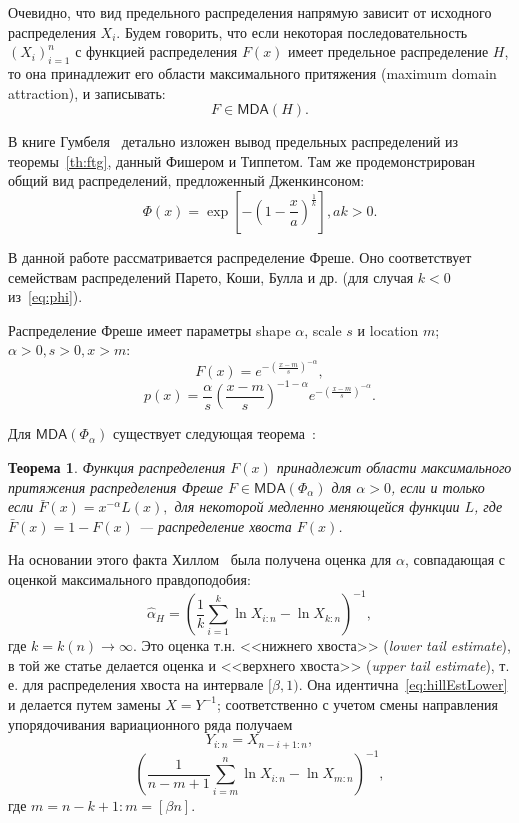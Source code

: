 \documentclass[12pt, specialist, subf, substylefile = spbu.rtx]{disser}
\newtheorem{theorem}{Теорема}
\newcommand{\MDA}{\mathsf{MDA}}
\begin{document}
Очевидно, что вид предельного распределения напрямую зависит от исходного распределения $X_i$. Будем говорить, что если некоторая последовательность $(X_i)_{i=1}^n$ с функцией распределения $F(x)$ имеет предельное распределение $H$, то она принадлежит его области максимального притяжения (maximum domain attraction), и записывать:
$$
F \in \MDA(H).
$$

В книге Гумбеля~\cite[стр.~194]{Gumbel} детально изложен вывод предельных распределений из теоремы~\ref{th:ftg}, данный Фишером и Типпетом. Там же продемонстрирован общий вид распределений, предложенный Дженкинсоном:
\begin{equation}\label{eq:phi}
\Phi(x)=\exp\left[-\left(1-\frac{x}{a}\right)^{\frac{1}{k}}\right], ak>0.
\end{equation}

В данной работе рассматривается распределение Фреше. Оно соответствует семействам распределений Парето, Коши, Булла и др. (для случая $k<0$ из~\eqref{eq:phi}).

Распределение Фреше имеет параметры shape $\alpha$, scale $s$ и location $m$; $\alpha>0, s>0, x>m$:
$$ F(x)=e^{-(\frac{x-m}{s})^{-\alpha}}, $$
$$ p(x)=\frac{\alpha}{s} \left(\frac{x-m}{s}\right)^{-1-\alpha} e^{-(\frac{x-m}{s})^{-\alpha}}.$$

Для $\MDA(\Phi_\alpha)$ существует следующая теорема~\cite[стр.~142]{Embrechts}:
\begin{theorem}\label{th:freclim}
Функция распределения $F(x)$ принадлежит области максимального притяжения распределения Фреше $F \in \MDA(\Phi_\alpha)$ для $\alpha > 0$, если и только если $\bar{F}(x)=x^{-\alpha}L(x),$ для некоторой медленно меняющейся функции $L$, где $\bar{F}(x)=1-F(x)$ --- распределение хвоста $F(x)$.
\end{theorem}
На основании этого факта Хиллом~\cite{Hill} была получена оценка для $\alpha$, совпадающая с оценкой максимального правдоподобия:
\begin{equation}\label{eq:hillEstLower}
\hat{\alpha}_H=\left(\frac{1}{k} \sum\limits_{i=1}^k \ln X_{i:n}-\ln X_{k:n} \right)^{-1},
\end{equation}
где $k=k(n) \to \infty$. Это оценка т.н. <<нижнего хвоста>> (\textit{lower tail estimate}), в той же статье делается оценка и <<верхнего хвоста>> (\textit{upper tail estimate}), т. е. для распределения хвоста на интервале $[\beta, 1)$. Она идентична~\eqref{eq:hillEstLower} и делается путем замены $X=Y^{-1}$; соответственно с учетом смены направления упорядочивания вариационного ряда получаем 
$$
Y_{i:n}=X_{n-i+1:n},
$$
\begin{equation}\label{eq:hillEst}
\left(\frac{1}{n-m+1} \sum\limits_{i=m}^n \ln X_{i:n}-\ln X_{m:n} \right)^{-1},
\end{equation}
где $m=n-k+1 : m=[\beta n]$.
\end{document}
